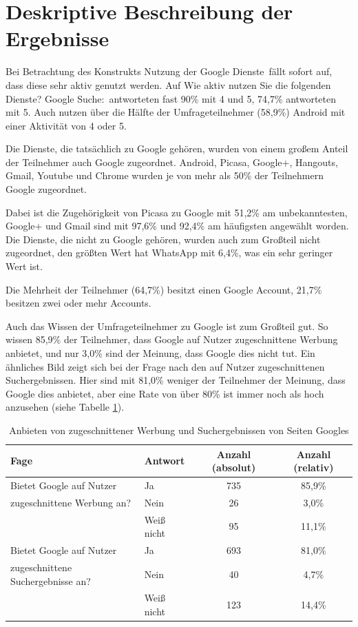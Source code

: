 \section{Deskriptive Beschreibung der Ergebnisse}

Bei Betrachtung des Konstrukts \glqq Nutzung der Google Dienste\grqq\ fällt sofort auf, dass diese sehr aktiv genutzt werden. Auf \glqq Wie aktiv nutzen Sie die folgenden Dienste? Google Suche:\grqq\ antworteten fast 90\% mit 4 und 5, 74,7\% antworteten mit 5. Auch nutzen über die Hälfte der Umfrageteilnehmer (58,9\%) Android mit einer Aktivität von 4 oder 5.

Die Dienste, die tatsächlich zu Google gehören, wurden von einem großem Anteil der Teilnehmer auch Google zugeordnet. Android, Picasa, Google+, Hangouts, Gmail, Youtube und Chrome wurden je von mehr als 50\% der Teilnehmern Google zugeordnet.

Dabei ist die Zugehörigkeit von Picasa zu Google mit 51,2\% am unbekanntesten, Google+ und Gmail sind mit 97,6\% und 92,4\% am häufigsten angewählt worden. Die Dienste, die nicht zu Google gehören, wurden auch zum Großteil nicht zugeordnet, den größten Wert hat WhatsApp mit 6,4\%, was ein sehr geringer Wert ist.

Die Mehrheit der Teilnehmer (64,7\%) besitzt einen Google Account, 21,7\% besitzen zwei oder mehr Accounts.

Auch das Wissen der Umfrageteilnehmer zu Google ist zum Großteil gut. So wissen 85,9\% der Teilnehmer, dass Google auf Nutzer zugeschnittene Werbung anbietet, und nur 3,0\% sind der Meinung, dass Google dies nicht tut. Ein ähnliches Bild zeigt sich bei der Frage nach den auf Nutzer zugeschnittenen Suchergebnissen. Hier sind mit 81,0\%  weniger der Teilnehmer der Meinung, dass Google dies anbietet, aber eine Rate von über 80\% ist immer noch als hoch anzusehen (siehe Tabelle \ref{fittingAdsAndSearch}).

\begin{table}
	\begin{tabular}[]{ l | l | c | c}
		\hline
		Fage & Antwort & Anzahl (absolut) & Anzahl (relativ)\\ \hline \hline
		Bietet Google auf Nutzer& Ja & 735 & 85,9\%\\
		zugeschnittene Werbung an? & Nein & 26 & 3,0\%\\
		& Weiß nicht & 95 & 11,1\% \\
		\hline
		Bietet Google auf Nutzer& Ja & 693 & 81,0\% \\
		zugeschnittene Suchergebnisse an? & Nein & 40 & 4,7\% \\
		& Weiß nicht & 123 & 14,4\% \\
		 \hline
	\end{tabular}
	\caption{Anbieten von zugeschnittener Werbung und Suchergebnissen von Seiten Googles}\label{fittingAdsAndSearch}
\end{table}


